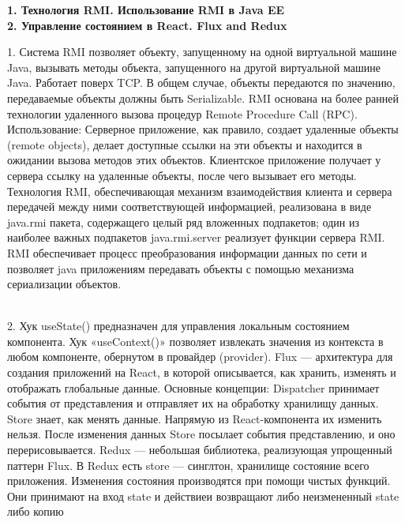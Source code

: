 \documentclass{article}
\newcommand{\bil}[4]{%
    \begin{minipage}{.3\textwidth}
        \textbf{1. #1} \\
        \textbf{2. #2}

        1. #3
        \\
        2. #4
    \end{minipage}
}
\begin{document}
\bil{Технология RMI. Использование RMI в Java EE}{Управление состоянием в React. Flux and Redux}{
    Система RMI позволяет объекту, запущенному на одной виртуальной машине Java, вызывать методы объекта, запущенного на другой виртуальной машине Java. Работает поверх TCP. В общем случае, объекты передаются по значению, передаваемые объекты должны быть Serializable.
    RMI основана на более ранней технологии удаленного вызова процедур Remote Procedure Call (RPC).
    Использование: 
    Серверное приложение, как правило, создает удаленные объекты (remote objects), делает доступные ссылки на эти объекты и находится в ожидании вызова методов этих объектов. 
    Клиентское приложение получает у сервера ссылку на удаленные объекты, после чего вызывает его методы. 
    Технология RMI, обеспечивающая механизм взаимодействия клиента и сервера передачей между ними соответствующей информацией, реализована в виде java.rmi пакета, содержащего целый ряд вложенных подпакетов; один из наиболее важных подпакетов java.rmi.server реализует функции сервера RMI.
    RMI обеспечивает процесс преобразования информации данных по сети и позволяет java приложениям передавать объекты с помощью механизма сериализации объектов.
}{
    Хук useState() предназначен для управления локальным состоянием компонента.
    Хук «useContext()» позволяет извлекать значения из контекста в любом компоненте, обернутом в провайдер (provider).
    Flux — архитектура для создания приложений на React, в которой описывается, как хранить, изменять и отображать глобальные данные.
Основные концепции: Dispatcher принимает события от представления и отправляет их на обработку хранилищу данных. Store знает, как менять данные. Напрямую из React-компонента их изменить нельзя. После изменения данных Store посылает события представлению, и оно перерисовывается.
Redux — небольшая библиотека, реализующая упрощенный паттерн Flux. В Redux есть store — синглтон, хранилище состояние всего приложения. Изменения состояния производятся при помощи чистых функций. Они принимают на вход state и действиеи возвращают либо неизмененный state либо копию
}
\hfill
\end{document}
